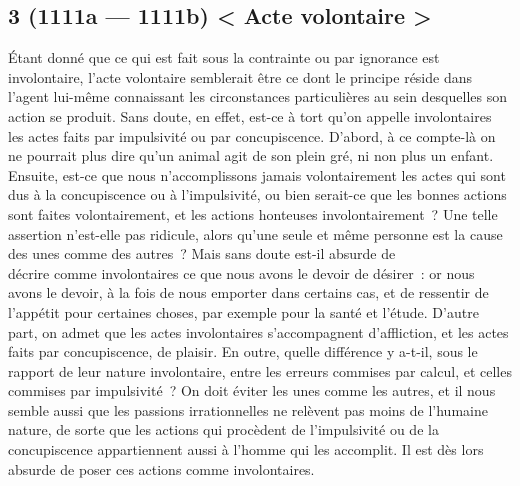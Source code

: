 \documentclass[french,twoside]{book} %
\begin{document}
\subsection[{3 (1111a — 1111b) < Acte volontaire >}]{3 (1111a — 1111b) < Acte volontaire >}
\noindent Étant donné que ce qui est fait sous la contrainte ou par ignorance est involontaire, l’acte volontaire semblerait être ce dont le principe réside dans l’agent lui-même connaissant les circonstances particulières au sein desquelles son action se produit. Sans doute, en effet, est-ce à tort qu’on appelle involontaires \\
les actes faits par impulsivité ou par concupiscence. D’abord, à ce compte-là on ne pourrait plus dire qu’un animal agit de son plein gré, ni non plus un enfant. Ensuite, est-ce que nous n’accomplissons jamais volontairement les actes qui sont dus à la concupiscence ou à l’impulsivité, ou bien serait-ce que les bonnes actions sont faites volontairement, et les actions honteuses involontairement ? Une telle assertion n’est-elle pas ridicule, alors qu’une seule et même personne est la cause des unes comme des autres ? Mais sans doute est-il absurde de \\
décrire comme involontaires ce que nous avons le devoir de désirer : or nous avons le devoir, à la fois de nous emporter dans certains cas, et de ressentir de l’appétit pour certaines choses, par exemple pour la santé et l’étude. D’autre part, on admet que les actes involontaires s’accompagnent d’affliction, et les actes faits par concupiscence, de plaisir. En outre, quelle différence y a-t-il, sous le rapport de leur nature involontaire, entre les erreurs commises par calcul, et celles commises par impulsivité ? On doit éviter les unes comme les autres, et il  nous semble aussi que les passions irrationnelles ne relèvent pas moins de l’humaine nature, de sorte que les actions qui procèdent de l’impulsivité ou de la concupiscence appartiennent aussi à l’homme qui les accomplit. Il est dès lors absurde de poser ces actions comme involontaires.
\end{document}
